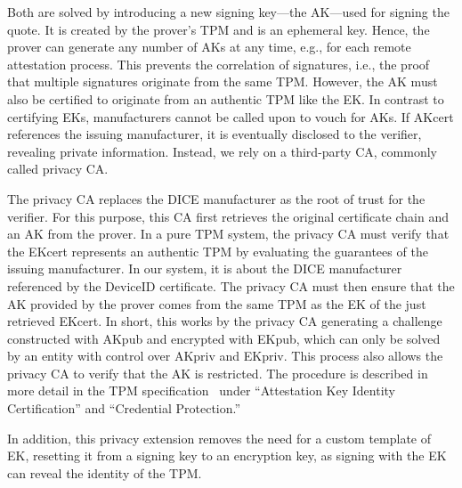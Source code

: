 
Both are solved by introducing a new signing key---the \ac{AK}---used for signing the quote.
It is created by the prover's TPM and is an ephemeral key.
Hence, the prover can generate any number of \acp{AK} at any time, e.g., for each remote attestation process.
This prevents the correlation of signatures, i.e., the proof that multiple signatures originate from the same TPM\@.
However, the AK must also be certified to originate from an authentic TPM like the EK\@.
In contrast to certifying \acp{EK}, manufacturers cannot be called upon to vouch for \acp{AK}.
If AKcert references the issuing manufacturer, it is eventually disclosed to the verifier, revealing private information.
Instead, we rely on a third-party \ac{CA}, commonly called privacy \ac{CA}\@.

The privacy \ac{CA} replaces the DICE manufacturer as the root of trust for the verifier.
For this purpose, this \ac{CA} first retrieves the original certificate chain and an AK from the prover.
In a pure TPM system, the privacy \ac{CA} must verify that the EKcert represents an authentic TPM by evaluating the guarantees of the issuing manufacturer.
In our system, it is about the DICE manufacturer referenced by the DeviceID certificate.
The privacy \ac{CA} must then ensure that the AK provided by the prover comes from the same TPM as the EK of the just retrieved EKcert.
In short, this works by the privacy \ac{CA} generating a challenge constructed with AKpub and encrypted with EKpub, which can only be solved by an entity with control over AKpriv and EKpriv\@.
This process also allows the privacy \ac{CA} to verify that the AK is restricted.
The procedure is described in more detail in the TPM specification~\cite{tpm20} under ``Attestation Key Identity Certification'' and ``Credential Protection.''

In addition, this privacy extension removes the need for a custom template of \ac{EK}, resetting it from a signing key to an encryption key, as signing with the EK can reveal the identity of the TPM\@.

